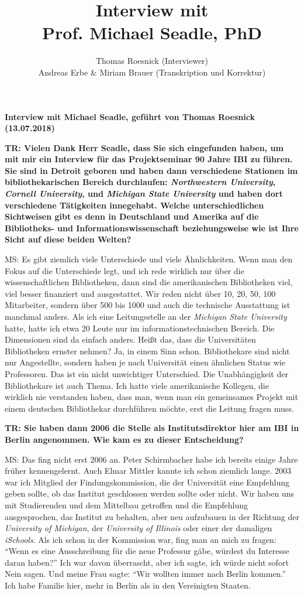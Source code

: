 \documentclass[a4paper,
fontsize=11pt,
oneside,
numbers=noperiodatend,
parskip=half-,
bibliography=totoc,
final
]{scrartcl}
\title{\LARGE{Interview mit \\ Prof. Michael Seadle, PhD}}%
\author{Thomas Roesnick (Interviewer) \\ Andreas Erbe \& Miriam Brauer (Transkription und Korrektur)} %
\date{}
\begin{document}
\maketitle
\thispagestyle{fancyplain} 


\textbf{{Interview mit Michael Seadle, geführt von Thomas Roesnick
(13.07.2018)}}

\textbf{TR: Vielen Dank Herr Seadle, dass Sie sich eingefunden haben, um
mit mir ein Interview für das Projektseminar 90 Jahre IBI zu führen. Sie
sind in Detroit geboren und haben dann verschiedene Stationen im
bibliothekarischen Bereich durchlaufen: \emph{Northwestern University},
\emph{Cornell University}, und \emph{Michigan State University} und
haben dort verschiedene Tätigkeiten innegehabt. Welche unterschiedlichen
Sichtweisen gibt es denn in Deutschland und Amerika auf die Bibliotheks-
und Informationswissenschaft beziehungsweise wie ist Ihre Sicht auf
diese beiden Welten?}

MS: Es gibt ziemlich viele Unterschiede und viele Ähnlichkeiten. Wenn
man den Fokus auf die Unterschiede legt, und ich rede wirklich nur über
die wissenschaftlichen Bibliotheken, dann sind die amerikanischen
Bibliotheken viel, viel besser finanziert und ausgestattet. Wir reden
nicht über 10, 20, 50, 100 Mitarbeiter, sondern über 500 bis 1000 und
auch die technische Ausstattung ist manchmal anders. Als ich eine
Leitungsstelle an der \emph{Michigan State University} hatte, hatte ich
etwa 20 Leute nur im informationstechnischen Bereich. Die Dimensionen
sind da einfach anders. Heißt das, dass die Universitäten Bibliotheken
ernster nehmen? Ja, in einem Sinn schon. Bibliothekare sind nicht nur
Angestellte, sondern haben je nach Universität einen ähnlichen Status
wie Professoren. Das ist ein nicht unwichtiger Unterschied. Die
Unabhängigkeit der Bibliothekare ist auch Thema. Ich hatte viele
amerikanische Kollegen, die wirklich nie verstanden haben, dass man,
wenn man ein gemeinsames Projekt mit einem deutschen Bibliothekar
durchführen möchte, erst die Leitung fragen muss.

\textbf{TR: Sie haben dann 2006 die Stelle als Institutsdirektor hier am
IBI in Berlin angenommen. Wie kam es zu dieser Entscheidung?}

MS: Das fing nicht erst 2006 an. Peter Schirmbacher habe ich bereits
einige Jahre früher kennengelernt. Auch Elmar Mittler kannte ich schon
ziemlich lange. 2003 war ich Mitglied der Findungskommission, die der
Universität eine Empfehlung geben sollte, ob das Institut geschlossen
werden sollte oder nicht. Wir haben uns mit Studierenden und dem
Mittelbau getroffen und die Empfehlung ausgesprochen, das Institut zu
behalten, aber neu aufzubauen in der Richtung der \emph{University of
Michigan}, der \emph{University of Illinois} oder einer der damaligen
\emph{iSchools}. Als ich schon in der Kommission war, fing man an mich
zu fragen: \enquote{Wenn es eine Ausschreibung für die neue Professur
gäbe, würdest du Interesse daran haben?} Ich war davon überrascht, aber
ich sagte, ich würde nicht sofort Nein sagen. Und meine Frau sagte:
\enquote{Wir wollten immer nach Berlin kommen.} Ich habe Familie hier,
mehr in Berlin als in den Vereinigten Staaten.
\end{document}
